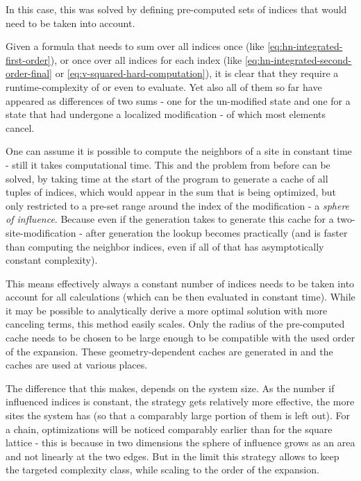 In this case, this was solved by defining pre-computed sets of indices that would need to be taken into account.

Given a formula that needs to sum over all indices once (like \autoref{eq:hn-integrated-first-order}), or once over all indices for each index (like \autoref{eq:hn-integrated-second-order-final} or \autoref{eq:v-squared-hard-computation}), it is clear that they require a runtime-complexity of  or even  to evaluate.
Yet also all of them so far have appeared as differences of two sums - one for the un-modified state and one for a state that had undergone a localized modification - of which most elements cancel.

One can assume it is possible to compute the neighbors of a site in constant time - still it takes computational time.
This and the problem from before can be solved, by taking time at the start of the program to generate a cache of all tuples of indices, which would appear in the sum that is being optimized, but only restricted to a pre-set range around the index of the modification - a \emph{sphere of influence}.
Because even if the generation takes  to generate this cache for a two-site-modification - after generation the lookup becomes practically  (and is faster than computing the neighbor indices, even if all of that has asymptotically constant complexity).

This means effectively always a constant number of indices needs to be taken into account for all calculations (which can be then evaluated in constant time).
While it may be possible to analytically derive a more optimal solution with more canceling terms, this method easily scales.
Only the radius of the pre-computed cache needs to be chosen to be large enough to be compatible with the used order of the expansion.
These geometry-dependent caches are generated in  and the caches are used at various places.

The difference that this makes, depends on the system size. 
As the number if influenced indices is constant, the strategy gets relatively more effective, the more sites the system has (so that a comparably large portion of them is left out).
For a chain, optimizations will be noticed comparably earlier than for the square lattice - this is because in two dimensions the sphere of influence grows as an area and not linearly at the two edges.
But in the limit this strategy allows to keep the targeted complexity class, while scaling to the order of the expansion.